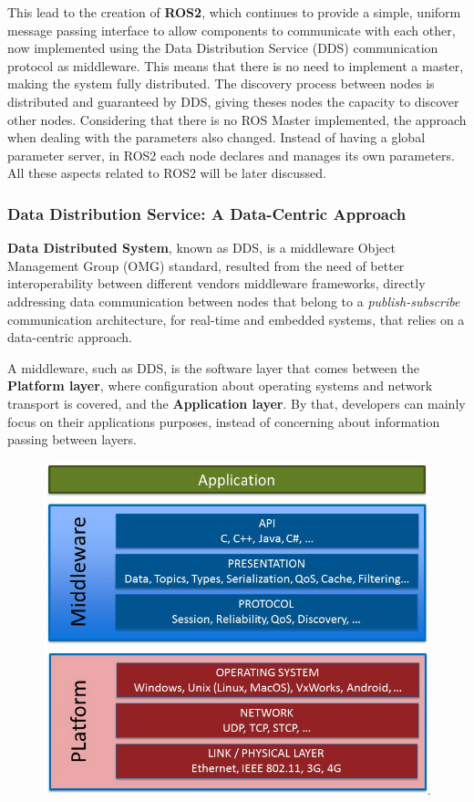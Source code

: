This lead to the creation of \textbf{ROS2}, which continues to provide a simple, uniform message passing interface to allow components to communicate with each other, now implemented using the Data Distribution Service (DDS) communication protocol as middleware. This means that there is no need to implement a master, making the system fully distributed. The discovery process between nodes is distributed and guaranteed by DDS, giving theses nodes the capacity to discover other nodes. Considering that there is no ROS Master implemented, the approach when dealing with the parameters also changed. Instead of having a global parameter server, in ROS2 each node declares and manages its own parameters. All these aspects related to ROS2 will be later discussed.

\subsubsection{Data Distribution Service: A Data-Centric Approach}

\textbf{Data Distributed System}, known as DDS, is a middleware Object Management Group (OMG) standard, resulted from the need of better interoperability between different vendors middleware frameworks, directly addressing data communication between nodes that belong to a \textit{publish-subscribe} communication architecture, for real-time and embedded systems, that relies on a data-centric approach. 
            
A middleware, such as DDS, is the software layer that comes between the \textbf{Platform layer}, where configuration about operating systems and network transport is covered, and the \textbf{Application layer}. By that, developers can mainly focus on their applications purposes, instead of concerning about information passing between layers.

\begin{figure}[H]
        \centering
         \includegraphics[width=0.4\linewidth]{images/middleware.png}
\end{figure}

